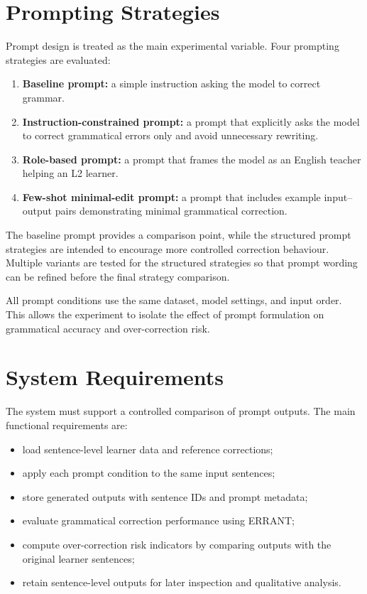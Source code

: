 \section{Prompting Strategies}

Prompt design is treated as the main experimental variable. Four prompting strategies are evaluated:

\begin{enumerate}
    \item \textbf{Baseline prompt:} a simple instruction asking the model to correct grammar.
    \item \textbf{Instruction-constrained prompt:} a prompt that explicitly asks the model to correct grammatical errors only and avoid unnecessary rewriting.
    \item \textbf{Role-based prompt:} a prompt that frames the model as an English teacher helping an L2 learner.
    \item \textbf{Few-shot minimal-edit prompt:} a prompt that includes example input--output pairs demonstrating minimal grammatical correction.
\end{enumerate}

The baseline prompt provides a comparison point, while the structured prompt strategies are intended to encourage more controlled correction behaviour. Multiple variants are tested for the structured strategies so that prompt wording can be refined before the final strategy comparison.

All prompt conditions use the same dataset, model settings, and input order. This allows the experiment to isolate the effect of prompt formulation on grammatical accuracy and over-correction risk.

\section{System Requirements}

The system must support a controlled comparison of prompt outputs. The main functional requirements are:

\begin{itemize}
    \item load sentence-level learner data and reference corrections;
    \item apply each prompt condition to the same input sentences;
    \item store generated outputs with sentence IDs and prompt metadata;
    \item evaluate grammatical correction performance using ERRANT;
    \item compute over-correction risk indicators by comparing outputs with the original learner sentences;
    \item retain sentence-level outputs for later inspection and qualitative analysis.
\end{itemize}

